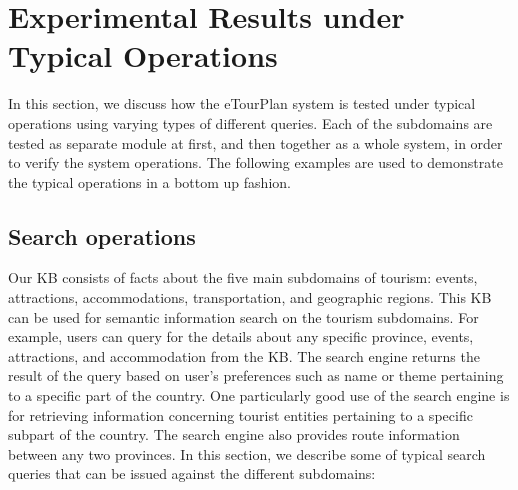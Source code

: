 \section{Experimental Results under Typical Operations}
\hspace{0.3in}In this section, we discuss how the eTourPlan system is tested under typical operations using varying types of different queries. Each of the subdomains are tested as separate module at first, and then together as a whole system, in order to verify the system operations. The following examples are used to demonstrate the typical operations in a bottom up fashion.

\subsection{Search operations}
\hspace{0.3in} Our KB consists of facts about the five main subdomains of tourism: events, attractions, accommodations, transportation, and geographic regions. This KB can be used for semantic information search on the tourism subdomains. For example, users can query for the details about any specific province, events, attractions, and accommodation from the KB. The search engine returns the result of the query based on user's preferences such as name or theme pertaining to a specific part of the country. One particularly good use of the search engine is for retrieving information concerning tourist entities pertaining to a specific subpart of the country. The search engine also provides route information between any two provinces. In this section, we describe some of typical search queries that can be issued against the different subdomains:\\

